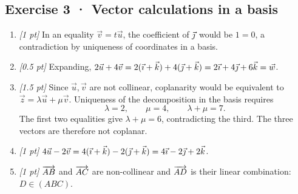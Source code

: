\subsection*{Exercise 3 · Vector calculations in a basis}\begin{enumerate}

\item \textit{[1 pt]} In an equality $\vec v=t\vec u$, the coefficient of $\vec{\jmath} $ would be $1=0$, a contradiction by uniqueness of coordinates in a basis.

\item \textit{[0.5 pt]} Expanding, $2\vec u+4\vec v=2(\vec{\imath} +\vec k)+4(\vec{\jmath} +\vec k)=2\vec{\imath} +4\vec{\jmath} +6\vec k=\vec w$.

\item \textit{[1.5 pt]} Since $\vec u,\vec v$ are not collinear, coplanarity would be equivalent to $\vec z=\lambda\vec u+\mu\vec v$. Uniqueness of the decomposition in the basis requires
\[\lambda=2,\qquad\mu=4,\qquad\lambda+\mu=7.\]
The first two equalities give $\lambda+\mu=6$, contradicting the third. The three vectors are therefore not coplanar.

\item \textit{[1 pt]} $4\vec u-2\vec v=4(\vec{\imath} +\vec k)-2(\vec{\jmath} +\vec k)=4\vec{\imath} -2\vec{\jmath} +2\vec k$.

\item \textit{[1 pt]} $\overrightarrow{AB}$ and $\overrightarrow{AC}$ are non-collinear and $\overrightarrow{AD}$ is their linear combination: $D\in(ABC)$.

\end{enumerate}


